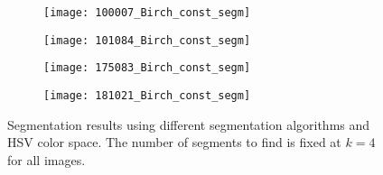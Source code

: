 \begin{figure}[!ht]
    
    \begin{subfigure}[t]{\textwidth+20pt\relax}
    	\centering
    	\texttt{[image: 100007\_Birch\_const\_segm]} 
    \end{subfigure}      
    \begin{subfigure}[b]{0.23\textwidth}
    	\centering
        \texttt{[image: 101084\_Birch\_const\_segm]}
    \end{subfigure}
    \begin{subfigure}[b]{0.23\textwidth}
    	\centering
        \texttt{[image: 175083\_Birch\_const\_segm]}
    \end{subfigure}
    \begin{subfigure}[b]{0.23\textwidth}
    	\centering
        \texttt{[image: 181021\_Birch\_const\_segm]}
    \end{subfigure} \vspace{5pt}
    
	\caption{Segmentation results using different segmentation algorithms and HSV color space. The number of segments to find is fixed at $ k = 4 $ for all images. }\label{fig:BSD_clustering _results}    
\end{figure}


